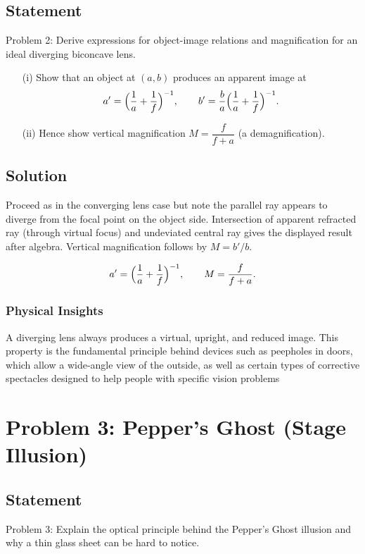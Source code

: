 \documentclass[12pt,a4paper]{article}
\newcommand{\bluebox}[1]{\begin{tcolorbox}#1\end{tcolorbox}}
\begin{document}
\subsection*{Statement }
Problem 2: Derive expressions for object-image relations and magnification for an ideal diverging biconcave lens.
\begin{enumerate}[leftmargin=*]
  \item[(i)] Show that an object at $(a,b)$ produces an apparent image at
  \[
    a'=\Bigl(\frac{1}{a}+\frac{1}{f}\Bigr)^{-1},\qquad b'=\frac{b}{a}\Bigl(\frac{1}{a}+\frac{1}{f}\Bigr)^{-1}.
  \]
  \item[(ii)] Hence show vertical magnification $M=\dfrac{f}{f+a}$ (a demagnification).
\end{enumerate}

\subsection*{Solution }
Proceed as in the converging lens case but note the parallel ray appears to diverge from the focal point on the object side. Intersection of apparent refracted ray (through virtual focus) and undeviated central ray gives the displayed result after algebra. Vertical magnification follows by $M=b'/b$.

\bluebox{\[
a'=\Bigl(\frac{1}{a}+\frac{1}{f}\Bigr)^{-1},\qquad M=\frac{f}{f+a}.
\]}

\subsubsection*{Physical Insights}
A diverging lens always produces a virtual, upright, and reduced image. This property is the fundamental principle behind devices such as peepholes in doors, which allow a wide-angle view of the outside, as well as certain types of corrective spectacles designed to help people with specific vision problems

\newpage


\section{Problem 3: Pepper's Ghost (Stage Illusion)}
\subsection*{Statement }
Problem 3: Explain the optical principle behind the Pepper's Ghost illusion and why a thin glass sheet can be hard to notice.
\end{document}
